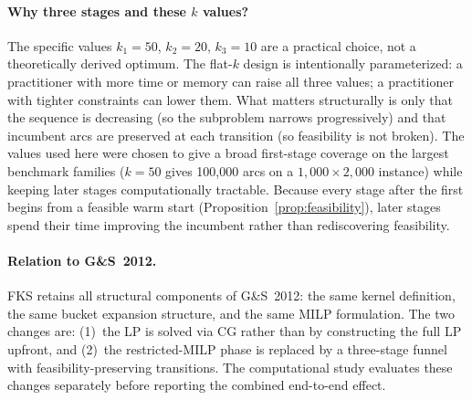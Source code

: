 \paragraph{Why three stages and these $k$ values?}
The specific values $k_1=50$, $k_2=20$, $k_3=10$ are a practical choice, not
a theoretically derived optimum.
The flat-$k$ design is intentionally parameterized: a practitioner with more
time or memory can raise all three values; a practitioner with tighter
constraints can lower them.
What matters structurally is only that the sequence is decreasing (so the
subproblem narrows progressively) and that incumbent arcs are preserved at each
transition (so feasibility is not broken).
The values used here were chosen to give a broad first-stage coverage on the
largest benchmark families ($k=50$ gives 100{,}000 arcs on a $1{,}000\times
2{,}000$ instance) while keeping later stages computationally tractable.
Because every stage after the first begins from a feasible warm start
(Proposition~\ref{prop:feasibility}), later stages spend their time
improving the incumbent rather than rediscovering feasibility.

\paragraph{Relation to G\&S~2012.}
FKS retains all structural components of G\&S~2012: the same kernel
definition, the same bucket expansion structure, and the same MILP
formulation.
The two changes are: (1)~the LP is solved via CG rather than by constructing the
full LP upfront, and (2)~the restricted-MILP phase is replaced by a three-stage
funnel with feasibility-preserving transitions.
The computational study evaluates these changes separately before reporting the
combined end-to-end effect.
